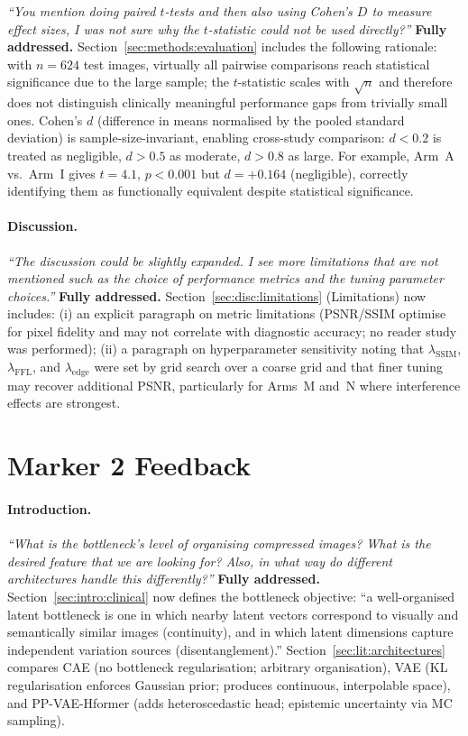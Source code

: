 \documentclass[12pt, a4paper, twoside, openright]{book}
\begin{document}
\begin{appendices}
\textit{``You mention doing paired $t$-tests and then also using Cohen's $D$ to measure effect sizes, I was not sure why the $t$-statistic could not be used directly?''}
\textbf{Fully addressed.} Section~\ref{sec:methods:evaluation} includes the following rationale: with $n = 624$ test images, virtually all pairwise comparisons reach statistical significance due to the large sample; the $t$-statistic scales with $\sqrt{n}$ and therefore does not distinguish clinically meaningful performance gaps from trivially small ones. Cohen's $d$ (difference in means normalised by the pooled standard deviation) is sample-size-invariant, enabling cross-study comparison: $d < 0.2$ is treated as negligible, $d > 0.5$ as moderate, $d > 0.8$ as large. For example, Arm~A vs.\ Arm~I gives $t = 4.1$, $p < 0.001$ but $d = +0.164$ (negligible), correctly identifying them as functionally equivalent despite statistical significance.

\paragraph{Discussion.}
\textit{``The discussion could be slightly expanded. I see more limitations that are not mentioned such as the choice of performance metrics and the tuning parameter choices.''}
\textbf{Fully addressed.} Section~\ref{sec:disc:limitations} (Limitations) now includes: (i) an explicit paragraph on metric limitations (PSNR/SSIM optimise for pixel fidelity and may not correlate with diagnostic accuracy; no reader study was performed); (ii) a paragraph on hyperparameter sensitivity noting that $\lambda_{\mathrm{SSIM}}$, $\lambda_{\mathrm{FFL}}$, and $\lambda_{\mathrm{edge}}$ were set by grid search over a coarse grid and that finer tuning may recover additional PSNR, particularly for Arms~M and~N where interference effects are strongest.

\section*{Marker 2 Feedback}

\paragraph{Introduction.}
\textit{``What is the bottleneck's level of organising compressed images? What is the desired feature that we are looking for? Also, in what way do different architectures handle this differently?''}
\textbf{Fully addressed.} Section~\ref{sec:intro:clinical} now defines the bottleneck objective: ``a well-organised latent bottleneck is one in which nearby latent vectors correspond to visually and semantically similar images (continuity), and in which latent dimensions capture independent variation sources (disentanglement).'' Section~\ref{sec:lit:architectures} compares CAE (no bottleneck regularisation; arbitrary organisation), VAE (KL regularisation enforces Gaussian prior; produces continuous, interpolable space), and PP-VAE-Hformer (adds heteroscedastic head; epistemic uncertainty via MC sampling).


\end{appendices}
\end{document}
